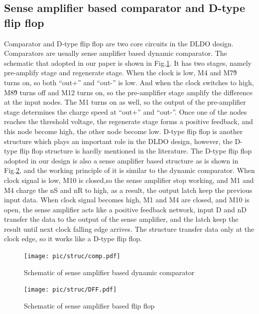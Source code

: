 \documentclass[journal]{IEEEtran}
\begin{document}
\subsection{Sense amplifier based comparator and D-type flip flop}
Comparator and D-type flip flop are two core circuits in the DLDO design. Comparators are usually sense amplifier based dynamic comparator. The schematic that adopted in our paper is shown in Fig.\ref{fig:comp}. It has two stages, namely pre-amplify stage and regenerate stage. When the clock is low, M4 and M7\~9 turns on, so both ``out+'' and ``out-'' is low. And when the clock switches to high, M8\~9 turns off and M12 turns on, so the pre-amplifier stage amplify the difference at the input nodes. The M1 turns on as well, so the output of the pre-amplifier stage determines the charge speed at ``out+'' and ``out-''. Once one of the nodes reaches the threshold voltage, the regenerate stage forms a positive feedback, and this node become high, the other node become low. D-type flip flop is another structure which plays an important role in the DLDO design, however, the D-type flip flop structure is hardly mentioned in the literature. The D-type flip flop adopted in our design is also a sense amplifier based structure as is shown in Fig.\ref{fig:DFF}, and the working principle of it is similar to the dynamic comparator.  When clock signal is low, M10 is closed,so the sense amplifier stop working, and M1 and M4 charge the nS and nR to high, as a result, the output latch keep the previous input data. When clock signal becomes high, M1 and M4 are closed, and M10 is open, the sense amplifier acts like a positive feedback network, input D and nD transfer the data to the output of the sense amplifier, and the latch keep the result until next clock falling edge arrives. The structure transfer data only at the clock edge, so it works like a D-type flip flop.
\begin{figure}[t!]
    \centering
    \texttt{[image: pic/struc/comp.pdf]}
    \caption{Schematic of sense amplifier based dynamic comparator}
    \label{fig:comp}
\end{figure}
\begin{figure}[t!]
    \centering
    \texttt{[image: pic/struc/DFF.pdf]}
    \caption{Schematic of sense amplifier based flip flop}
    \label{fig:DFF}
\end{figure}
\end{document}

